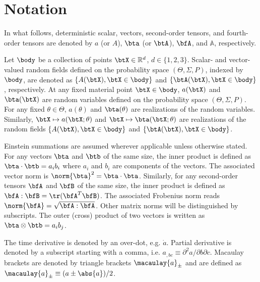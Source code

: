 \section{Notation}

In what follows, deterministic scalar, vectors, second-order tensors, and fourth-order tensors are denoted by $a$ (or $A$), $\bta$ (or $\btA$), $\bfA$, and $\mathbb{A}$, respectively.

Let $\body$ be a collection of points $\btX \in \mathbb{R}^d$, $d \in \{1, 2, 3\}$. Scalar- and vector-valued random fields defined on the probability space $(\Theta, \Sigma, P)$, indexed by $\body$, are denoted as $\{ A(\btX), \btX \in \body \}$ and $\{ \btA(\btX), \btX \in \body \}$, respectively.
At any fixed material point $\btX \in \body$, $a(\btX)$ and $\bta(\btX)$ are random variables defined on the probability space $(\Theta, \Sigma, P)$. For any fixed $\theta \in \Theta$, $a(\theta)$ and $\bta(\theta)$ are realizations of the random variables.
Similarly, $\btX \mapsto a(\btX;\theta)$ and $\btX \mapsto \bta(\btX;\theta)$ are realizations of the random fields $\{ A(\btX), \btX \in \body \}$ and $\{ \btA(\btX), \btX \in \body \}$.

Einstein summations are assumed wherever applicable unless otherwise stated. For any vectors $\bta$ and $\btb$ of the same size, the inner product is defined as $\bta \cdot \btb = a_ib_i$ where $a_i$ and $b_i$ are components of the vectors. The associated vector norm is $\norm{\bta}^2 = \bta \cdot \bta$. Similarly, for any second-order tensors $\bfA$ and $\bfB$ of the same size, the inner product is defined as $\bfA : \bfB = \tr(\bfA^T \bfB)$. The associated Frobenius norm reads $\norm{\bfA} = \sqrt{\bfA : \bfA}$. Other matrix norms will be distinguished by subscripts.
The outer (cross) product of two vectors is written as $\bta \otimes \btb = a_ib_j$.

The time derivative is denoted by an over-dot, e.g. $\dot{a}$. Partial derivative is denoted by a subscript starting with a comma, i.e. $ a_{,bc} \equiv \partial^2 a / \partial b \partial c $.
Macaulay brackets are denoted by triangle brackets $\macaulay{a}_\pm$ and are defined as $\macaulay{a}_\pm \equiv (a\pm\abs{a})/2$.

